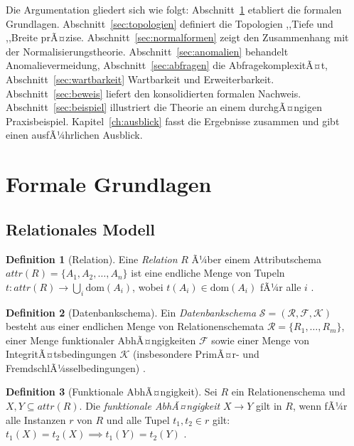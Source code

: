 ﻿\documentclass[a4paper,12pt]{report}
\theoremstyle{definition}
\newtheorem{definition}{Definition}[chapter]
\theoremstyle{remark}
\newcommand{\att}{\mathit{attr}}
\begin{document}
Die Argumentation gliedert sich wie folgt: Abschnitt~\ref{sec:grundlagen}
etabliert die formalen Grundlagen. Abschnitt~\ref{sec:topologien} definiert
die Topologien ,,Tiefe\grqq{} und ,,Breite\grqq{} prÃ¤zise.
Abschnitt~\ref{sec:normalformen} zeigt den Zusammenhang mit der
Normalisierungstheorie. Abschnitt~\ref{sec:anomalien} behandelt
Anomalievermeidung, Abschnitt~\ref{sec:abfragen} die AbfragekomplexitÃ¤t,
Abschnitt~\ref{sec:wartbarkeit} Wartbarkeit und Erweiterbarkeit.
Abschnitt~\ref{sec:beweis} liefert den konsolidierten formalen Nachweis.
Abschnitt~\ref{sec:beispiel} illustriert die Theorie an einem durchgÃ¤ngigen
Praxisbeispiel. Kapitel~\ref{ch:ausblick} fasst die Ergebnisse zusammen
und gibt einen ausfÃ¼hrlichen Ausblick.

\section{Formale Grundlagen}
\label{sec:grundlagen}

\subsection{Relationales Modell}

\begin{definition}[Relation]
Eine \emph{Relation} $R$ Ã¼ber einem Attributschema $\att(R) = \{A_1, A_2, \ldots, A_n\}$
ist eine endliche Menge von Tupeln $t: \att(R) \to \bigcup_{i} \mathrm{dom}(A_i)$,
wobei $t(A_i) \in \mathrm{dom}(A_i)$ fÃ¼r alle $i$ \cite{Codd1970}.
\end{definition}

\begin{definition}[Datenbankschema]
Ein \emph{Datenbankschema} $\mathcal{S} = (\mathcal{R}, \mathcal{F}, \mathcal{K})$
besteht aus einer endlichen Menge von Relationenschemata $\mathcal{R} = \{R_1, \ldots, R_m\}$,
einer Menge funktionaler AbhÃ¤ngigkeiten $\mathcal{F}$ sowie einer Menge von
IntegritÃ¤tsbedingungen $\mathcal{K}$ (insbesondere PrimÃ¤r- und FremdschlÃ¼sselbedingungen)
\cite{Ullman1988}.
\end{definition}

\begin{definition}[Funktionale AbhÃ¤ngigkeit]
Sei $R$ ein Relationenschema und $X, Y \subseteq \att(R)$.
Die \emph{funktionale AbhÃ¤ngigkeit} $X \to Y$ gilt in $R$, wenn fÃ¼r alle
Instanzen $r$ von $R$ und alle Tupel $t_1, t_2 \in r$ gilt:
$t_1(X) = t_2(X) \implies t_1(Y) = t_2(Y)$ \cite{Armstrong1974}.
\end{definition}
\end{document}
